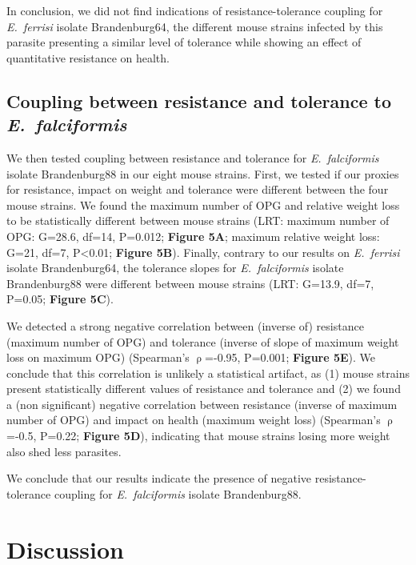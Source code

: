 \documentclass[12pt]{article}
\begin{document}
In conclusion, we did not find indications of resistance-tolerance coupling for \textit{E.~ferrisi} isolate Brandenburg64, the different mouse strains infected by this parasite presenting a similar level of tolerance while showing an effect of quantitative resistance on health.\par

\subsection{Coupling between resistance and tolerance to \textit{E.~falciformis}}

We then tested coupling between resistance and tolerance for \textit{E.~falciformis} isolate Brandenburg88 in our eight mouse strains. First, we tested if our proxies for resistance, impact on weight and tolerance were different between the four mouse strains. We found the maximum number of OPG and relative weight loss to be statistically different between mouse strains (LRT: maximum number of OPG: G=28.6, df=14, P=0.012; \textbf{Figure 5A}; maximum relative weight loss: G=21, df=7, P<0.01; \textbf{Figure 5B}). Finally, contrary to our results on \textit{E.~ferrisi} isolate Brandenburg64, the tolerance slopes for \textit{E.~falciformis} isolate Brandenburg88 were different between mouse strains (LRT: G=13.9, df=7, P=0.05; \textbf{Figure 5C}).\par

We detected a strong negative correlation between (inverse of) resistance (maximum number of OPG) and tolerance (inverse of slope of maximum weight loss on maximum OPG) (Spearman's $\uprho$=-0.95, P=0.001; \textbf{Figure 5E}). We conclude that this correlation is unlikely a statistical artifact, as (1) mouse strains present statistically different values of resistance and tolerance and (2) we found a (non significant) negative correlation between resistance (inverse of maximum number of OPG) and impact on health (maximum weight loss) (Spearman's $\uprho$=-0.5, P=0.22; \textbf{Figure 5D}), indicating that mouse strains losing more weight also shed less parasites. \par

We conclude that our results indicate the presence of negative resistance-tolerance coupling for \textit{E.~falciformis} isolate Brandenburg88.

\section*{Discussion}
\end{document}
